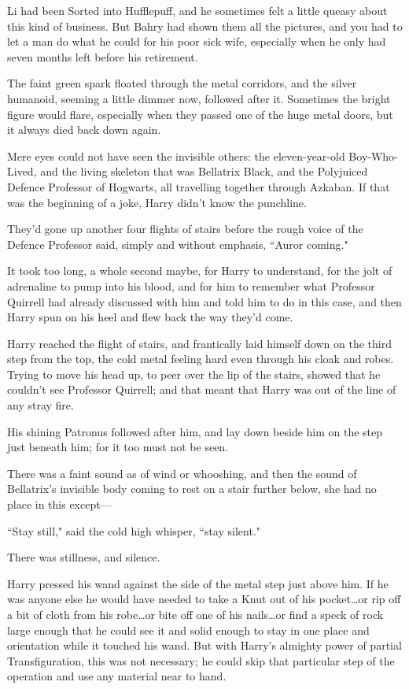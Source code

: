 Li had been Sorted into Hufflepuff, and he sometimes felt a little queasy about this kind of business. But Bahry had shown them all the pictures, and you had to let a man do what he could for his poor sick wife, especially when he only had seven months left before his retirement.

\later

The faint green spark floated through the metal corridors, and the silver humanoid, seeming a little dimmer now, followed after it. Sometimes the bright figure would flare, especially when they passed one of the huge metal doors, but it always died back down again.

Mere eyes could not have seen the invisible others: the eleven-year-old Boy-Who-Lived, and the living skeleton that was Bellatrix Black, and the Polyjuiced Defence Professor of Hogwarts, all travelling together through Azkaban. If that was the beginning of a joke, Harry didn't know the punchline.

They'd gone up another four flights of stairs before the rough voice of the Defence Professor said, simply and without emphasis, ``Auror coming."

It took too long, a whole second maybe, for Harry to understand, for the jolt of adrenaline to pump into his blood, and for him to remember what Professor Quirrell had already discussed with him and told him to do in this case, and then Harry spun on his heel and flew back the way they'd come.

Harry reached the flight of stairs, and frantically laid himself down on the third step from the top, the cold metal feeling hard even through his cloak and robes. Trying to move his head up, to peer over the lip of the stairs, showed that he couldn't see Professor Quirrell; and that meant that Harry was out of the line of any stray fire.

His shining Patronus followed after him, and lay down beside him on the step just beneath him; for it too must not be seen.

There was a faint sound as of wind or whooshing, and then the sound of Bellatrix's invisible body coming to rest on a stair further below, she had no place in this except—

``Stay still," said the cold high whisper, ``stay silent."

There was stillness, and silence.

Harry pressed his wand against the side of the metal step just above him. If he was anyone else he would have needed to take a Knut out of his pocket…or rip off a bit of cloth from his robe…or bite off one of his nails…or find a speck of rock large enough that he could see it and solid enough to stay in one place and orientation while it touched his wand. But with Harry's almighty power of partial Transfiguration, this was not necessary; he could skip that particular step of the operation and use any material near to hand.

